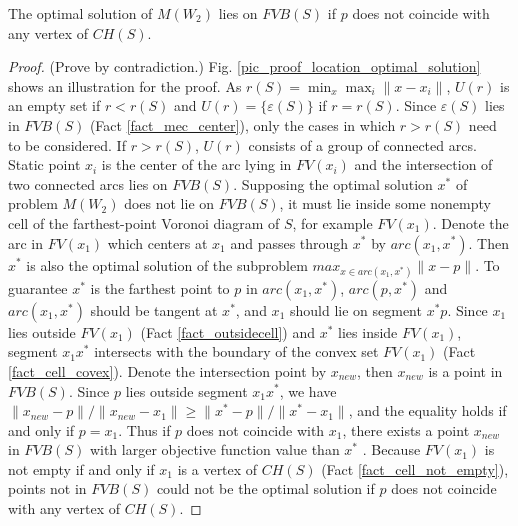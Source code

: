 \documentclass[final,3p,times]{elsarticle}
\begin{document}
\begin{Theorem}
\label{theorem_location}
The optimal solution of $M(W_2)$ lies on $FVB(S)$ if $p$ does not coincide with any vertex of $CH(S)$.
\end{Theorem}
\begin{proof}
(Prove by contradiction.) Fig. \ref{pic_proof_location_optimal_solution} shows an illustration for the proof. As $r(S)=\min_x \max_i \|x-x_i\|$, $U(r)$ is an empty set if $r<r(S)$ and $U(r)=\{\varepsilon(S)\}$ if $r=r(S)$. Since $\varepsilon(S)$ lies in $FVB(S)$ (Fact \ref{fact_mec_center}), only the cases in which $r>r(S)$ need to be considered.
If $r>r(S)$, $U(r)$ consists of a group of connected arcs. Static point $x_i$ is the center of the arc lying in $FV(x_i)$ and the intersection of two connected arcs lies on $FVB(S)$. Supposing the optimal solution $x^*$ of problem $M(W_2)$ does not lie on $FVB(S)$, it must lie inside some nonempty cell of the farthest-point Voronoi diagram of $S$, for example $FV(x_1)$. Denote the arc in $FV(x_1)$ which centers at $x_1$ and passes through $x^*$ by $arc(x_1,x^*)$. Then $x^*$ is also the optimal solution of the subproblem $max_{x\in arc(x_1,x^*)}\|x-p\|$. To guarantee $x^*$ is the farthest point to $p$ in $arc(x_1,x^*)$, $arc(p,x^*)$ and $arc(x_1,x^*)$ should be tangent at $x^*$, and $x_1$ should lie on segment $x^*p$. Since $x_1$ lies outside $FV(x_1)$ (Fact \ref{fact_outsidecell}) and $x^*$ lies inside $FV(x_1)$, segment $x_1x^*$ intersects with the boundary of the convex set $FV(x_1)$ (Fact \ref{fact_cell_covex}). Denote the intersection point by $x_{new}$, then $x_{new}$ is a point in $FVB(S)$. Since $p$ lies outside segment $x_1x^*$, we have $\|x_{new}-p\|/\|x_{new}-x_1\|\geq\|x^*-p\|/\|x^*-x_1\|$, and the equality holds if and only if $p=x_1$. Thus if $p$ does not coincide with $x_1$, there exists a point $x_{new}$ in $FVB(S)$ with larger objective function value than $x^*$ . Because $FV(x_1)$ is not empty if and only if $x_1$ is a vertex of $CH(S)$ (Fact \ref{fact_cell_not_empty}), points not in $FVB(S)$ could not be the optimal solution if $p$ does not coincide with any vertex of $CH(S)$.
\end{proof}
\end{document}
